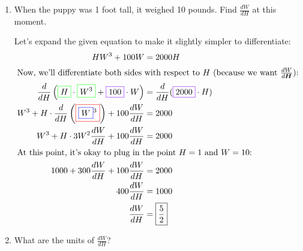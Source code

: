 \documentclass{article}
\begin{document}
\begin{enumerate}
  \begin{center}
  \end{center}
  
  \begin{enumerate}
  \item
    \begin{problem}[\vfill]
      When the puppy was 1 foot tall, it weighed 10 pounds.  Find $\frac{dW}{dH}$ at this moment.
    \end{problem}

    \begin{solution} %
      Let's expand the given equation to make it slightly simpler to
      differentiate:
      \begin{align*}
        HW^3 + 100W &= 2000H \\
        \intertext{Now, we'll differentiate both sides with respect to
          $H$ (because we want $\frac{dW}{d\bm{H}}$):} \frac{d}{dH}
        \left(\fcolorbox{green}{white}{$\displaystyle H$}\cdot
          \fcolorbox{green}{white}{$\displaystyle W^ { 3} $} +
          \fcolorbox{purple}{white}{$\displaystyle 100$}\cdot W\right) &= \frac{d}{dH}
        (\fcolorbox{purple}{white}{$\displaystyle 2000$}\cdot H) \\
        W^3 + H \cdot \frac{d}{dH}
        \left(\fcolorbox{red}{white}{$\displaystyle
            \fcolorbox{blue}{white}{$\displaystyle W$}^ { 3} $}\right) +
        100 \frac{dW}{dH}
        &= 2000 \\
        W^3 + H \cdot 3W^2 \frac{dW}{dH} + 100 \frac{dW}{dH} &= 2000 \\
        \intertext{At this point, it's okay to plug in the point $H=1$ and $W=10$:}
        1000 + 300 \frac{dW}{dH} + 100 \frac{dW}{dH} &= 2000 \\
        400 \frac{dW}{dH} &= 1000 \\
        \frac{dW}{dH} &= \boxed{\frac{5}{2}}
      \end{align*}
    \end{solution}

  \item
    \begin{problem}[\stretch{0.2}]
      What are the units of $\frac{dW}{dH}$?
    \end{problem}


\end{enumerate}
\end{enumerate}
\end{document}
